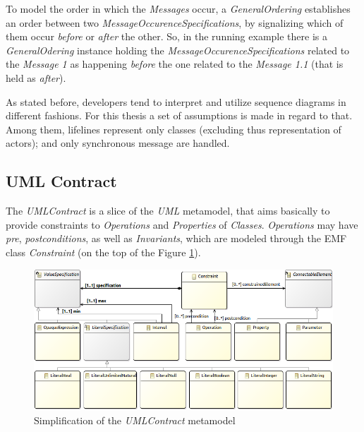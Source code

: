 \documentclass[tuberlin,cic,tc,english,noabntcite]{iiufrgs}
\begin{document}
To model the order in which the \emph{Messages} occur, a \emph{GeneralOrdering} establishes an order between two \emph{MessageOccurenceSpecifications}, by signalizing which of them occur \emph{before} or \emph{after} the other. So, in the running example there is a \emph{GeneralOdering} instance holding the \emph{MessageOccurenceSpecifications} related to the \emph{Message 1} as happening \emph{before} the one related to the \emph{Message 1.1} (that is held as \emph{after}).

As stated before, developers tend to interpret and utilize sequence diagrams in different fashions. For this thesis a set of assumptions is made in regard to that. Among them, lifelines represent only classes (excluding thus representation of actors); and only synchronous message are handled.

\subsection{UML Contract}
The \emph{UMLContract} is a slice of the \emph{UML} metamodel, that aims basically to provide constraints to \emph{Operations} and \emph{Properties} of \emph{Classes}. \emph{Operations} may have \emph{pre}, \emph{postconditions}, as well as \emph{Invariants}, which are modeled through the EMF class \emph{Constraint} (on the top of the Figure \ref{fig:uml_metamodel_contracts}).

\begin{figure}[H]
    \caption{Simplification of the \emph{UMLContract} metamodel}
    \begin{center}
        \includegraphics[width=\textwidth]{umlContractSimple01}
    \end{center}
    \label{fig:uml_metamodel_contracts}
\end{figure}
\end{document}
